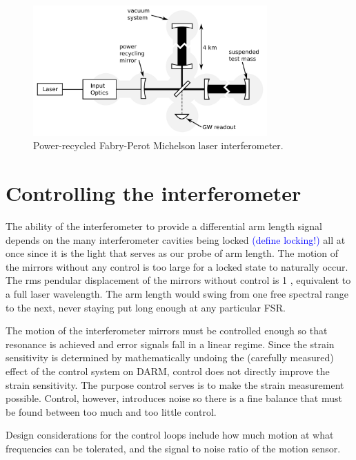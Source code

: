 \begin{figure}
\begin{centering}
\includegraphics[width=0.8\textwidth]{figures/IFOschematic.pdf}
\caption[Power-recycled Fabry-Perot Michelson laser interferometer]{Power-recycled Fabry-Perot Michelson laser interferometer.}
\label{fig:IFOschematic}
\end{centering}
\end{figure}



\section{Controlling the interferometer}
The ability of the interferometer to provide a differential arm length
signal depends on the many interferometer cavities being locked
\textcolor{blue}{(define locking!)} all at once since it is the light
that serves as our probe of arm length. The motion of the mirrors
without any control is too large for a locked state to naturally
occur. The rms pendular displacement of the mirrors without control is
1 \micron, equivalent to a full laser wavelength. The arm length would
swing from one free spectral range to the next, never staying put long
enough at any particular FSR. 

The motion of the interferometer mirrors must be controlled enough so
that resonance is achieved and error signals fall in a linear
regime. Since the strain sensitivity is determined by mathematically
undoing the (carefully measured) effect of the control system on DARM,
control does not directly improve the strain sensitivity. The purpose
control serves is to make the strain measurement possible. Control,
however, introduces noise so there is a fine balance that must be
found between too much and too little control.

Design considerations for the control loops include how much motion at
what frequencies can be tolerated, and the signal to noise ratio of
the motion sensor.


